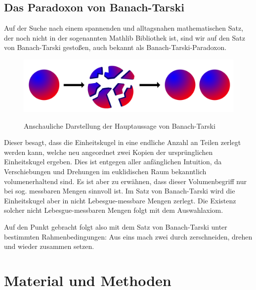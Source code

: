 \documentclass[10pt]{article}
\begin{document}
\subsection{Das Paradoxon von Banach-Tarski}\label{1.3}
Auf der Suche nach einem spannenden und alltagsnahen mathematischen Satz, der noch nicht in der sogenannten Mathlib Bibliothek ist, sind wir auf den Satz von Banach-Tarski gestoßen, auch bekannt als Banach-Tarski-Paradoxon.
\vspace*{-0.8cm}
\begin{figure}[H]
    \centering
    \includegraphics[scale=0.15]{Bild Banach Tarski.png}
    \label{Abb2}
    \caption{Anschauliche Darstellung der Hauptaussage von Banach-Tarski \cite{Q11} }
    
\end{figure}
\vspace{-0.2cm}
\noindent Dieser besagt, dass die Einheitskugel in eine endliche Anzahl an Teilen zerlegt werden kann, welche neu angeordnet zwei Kopien der ursprünglichen Einheitskugel ergeben. Dies ist entgegen aller anfänglichen Intuition, da Verschiebungen und Drehungen im euklidischen Raum bekanntlich volumenerhaltend sind. Es ist aber zu erwähnen, dass dieser Volumenbegriff nur bei sog. messbaren Mengen sinnvoll ist. Im Satz von Banach-Tarski wird die Einheitskugel aber in nicht Lebesgue-messbare Mengen zerlegt. Die Existenz solcher nicht Lebesgue-messbaren Mengen folgt mit dem Auswahlaxiom.

\noindent Auf den Punkt gebracht folgt also mit dem Satz von Banach-Tarski unter bestimmten Rahmenbedingungen: \glqq Aus eins mach zwei durch zerschneiden, drehen und wieder zusammen setzen\grqq.


\section{Material und Methoden}
\end{document}
